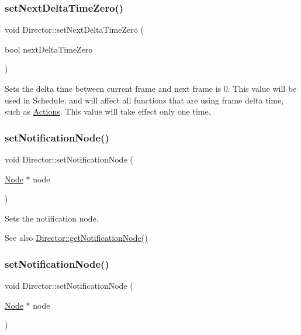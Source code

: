 \subsubsection{\texorpdfstring{set\+Next\+Delta\+Time\+Zero()}{setNextDeltaTimeZero()}\hspace{0.1cm}{\footnotesize\ttfamily [2/2]}}
{\footnotesize\ttfamily void Director\+::set\+Next\+Delta\+Time\+Zero (\begin{DoxyParamCaption}\item[{bool}]{next\+Delta\+Time\+Zero }\end{DoxyParamCaption})}

Sets the delta time between current frame and next frame is 0. This value will be used in Schedule, and will affect all functions that are using frame delta time, such as \hyperlink{classActions}{Actions}. This value will take effect only one time. \mbox{\label{classDirector_ae94a4dda12c81955813683e016f769dd}} 
\subsubsection{\texorpdfstring{set\+Notification\+Node()}{setNotificationNode()}\hspace{0.1cm}{\footnotesize\ttfamily [1/2]}}
{\footnotesize\ttfamily void Director\+::set\+Notification\+Node (\begin{DoxyParamCaption}\item[{\hyperlink{classNode}{Node} $\ast$}]{node }\end{DoxyParamCaption})}

Sets the notification node. \begin{DoxySeeAlso}{See also}
\hyperlink{classDirector_a33fe947ebf154c242198d3ad0d95cba4}{Director\+::get\+Notification\+Node()} 
\end{DoxySeeAlso}
\mbox{\label{classDirector_ae94a4dda12c81955813683e016f769dd}} 
\subsubsection{\texorpdfstring{set\+Notification\+Node()}{setNotificationNode()}\hspace{0.1cm}{\footnotesize\ttfamily [2/2]}}
{\footnotesize\ttfamily void Director\+::set\+Notification\+Node (\begin{DoxyParamCaption}\item[{\hyperlink{classNode}{Node} $\ast$}]{node }\end{DoxyParamCaption})}

